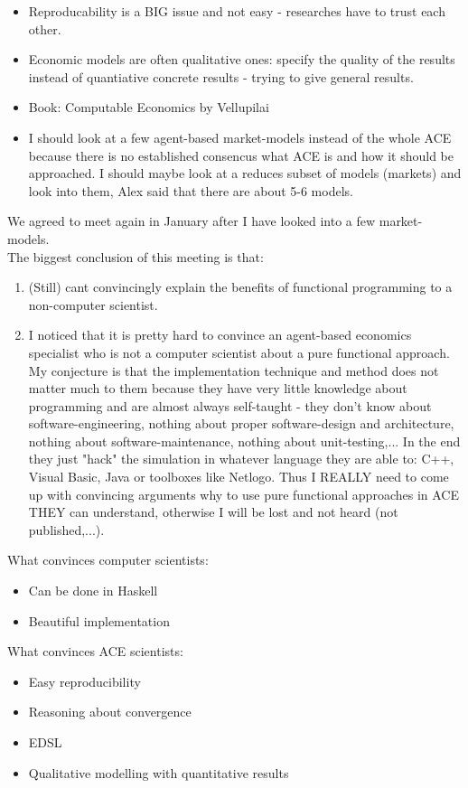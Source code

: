 \begin{itemize}
\item Reproducability is a BIG issue and not easy - researches have to trust each other.
\item Economic models are often qualitative ones: specify the quality of the results instead of quantiative concrete results - trying to give general results.
\item Book: Computable Economics by Vellupilai
\item I should look at a few agent-based market-models instead of the whole ACE because there is no established consencus what ACE is and how it should be approached. I should maybe look at a reduces subset of models (markets) and look into them, Alex said that there are about 5-6 models.
\end{itemize}

We agreed to meet again in January after I have looked into a few market-models. \\

The biggest conclusion of this meeting is that:
 
\begin{enumerate}
\item (Still) cant convincingly explain the benefits of functional programming to a non-computer scientist.
\item I noticed that it is pretty hard to convince an agent-based economics specialist who is not a computer scientist about a pure functional approach. My conjecture is that the implementation technique and method does not matter much to them because they have very little knowledge about programming and are almost always self-taught - they don't know about software-engineering, nothing about proper software-design and architecture, nothing about software-maintenance, nothing about unit-testing,... In the end they just "hack" the simulation in whatever language they are able to: C++, Visual Basic, Java or toolboxes like Netlogo. Thus I REALLY need to come up with convincing arguments why to use pure functional approaches in ACE THEY can understand, otherwise I will be lost and not heard (not published,...).
\end{enumerate}

What convinces computer scientists:
\begin{itemize}
\item Can be done in Haskell
\item Beautiful implementation 
\end{itemize}

What convinces ACE scientists:
\begin{itemize}
\item Easy reproducibility
\item Reasoning about convergence
\item EDSL
\item Qualitative modelling with quantitative results
\end{itemize}